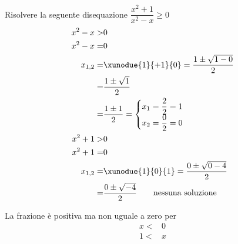 	Risolvere la seguente disequazione $\dfrac{x^2+1}{x^2-x}\geq0$	
\begin{align*}
x^2-x>&0\\
x^2-x=&0\\
x_{1,2}=&\xunodue{1}{+1}{0}=\dfrac{1\pm\sqrt{1-0}}{2}\\
=&\dfrac{1\pm\sqrt{1}}{2}\\
=&\dfrac{1\pm 1}{2}=\begin{cases}
	x_1=\dfrac{2}{2}=1\\
	x_2=\dfrac{0}{2}=0
\end{cases}\\
x^2+1>&0\\
x^2+1=&0\\
x_{1,2}=&\xunodue{1}{0}{1}=\dfrac{0\pm\sqrt{0-4}}{2}\\
=&\dfrac{0\pm\sqrt{-4}}{2}
\qquad\text{nessuna soluzione}\\
\end{align*}
\begin{center}

\end{center}
La frazione è positiva ma non uguale a zero per
\begin{align*}
x<&0\\ 1<&x\\
\end{align*}
